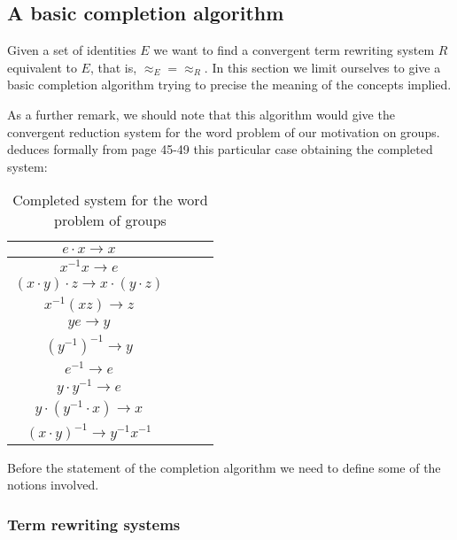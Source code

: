 \subsection{A basic completion algorithm}

Given a set of identities $E$ we want to find a convergent term rewriting system $R$ equivalent to $E$, that is, $\approx_E = \approx_R$. In this section we limit ourselves to give a basic completion algorithm trying to precise the meaning of the concepts implied. 

As a further remark, we should note that this algorithm would give the convergent reduction system for the word problem of our motivation on groups. \cite{handbook} deduces formally from page 45-49 this particular case obtaining the completed system:

\begin{table}[H]
\centering
\begin{tabular}{|| c | c | c | c ||}
\hline
\hline  $e \cdot x \to x$ \\
\hline $x^{-1}x \to e$ \\
\hline $(x \cdot y) \cdot z \to x \cdot (y \cdot z)$ \\
\hline $x^{-1}(xz) \to z$ \\
\hline $ye \to y$ \\
\hline $(y^{-1})^{-1} \to y$ \\
\hline $e^{-1} \to e$ \\
\hline $y \cdot y^{-1} \to e$ \\
\hline $y \cdot (y^{-1} \cdot x) \to x$ \\
\hline $(x \cdot y)^{-1} \to y^{-1}x^{-1}$ \\
\hline
\end{tabular}
\caption{Completed system for the word problem of groups}
\label{table:grupos}
\end{table}

Before the statement of the completion algorithm we need to define some of the notions involved.

\subsubsection{Term rewriting systems}

